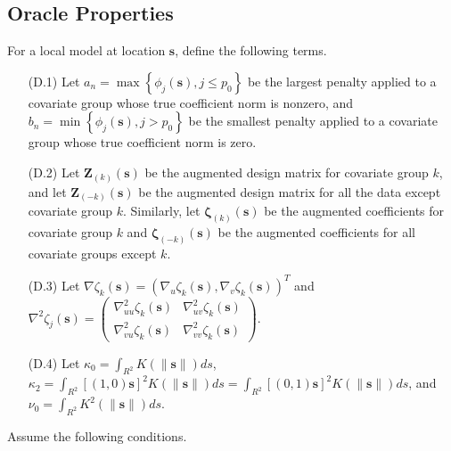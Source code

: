 \documentclass[authoryear,review, 12pt]{elsarticle}
\begin{document}
\subsection{Oracle Properties\label{sub:oracle-properties}}

For a local model at location $\bm{s}$, define the following terms.
\begin{itemize}
\item[(D.1)] Let $a_{n}=\max\left\{ \phi_{j}\left(\bm{s}\right),j\le p_{0}\right\} $
be the largest penalty applied to a covariate group whose true coefficient
norm is nonzero, and $b_{n}=\min\left\{ \phi_{j}\left(\bm{s}\right),j>p_{0}\right\} $
be the smallest penalty applied to a covariate group whose true coefficient
norm is zero.
\item[(D.2)] Let $\bm{Z}_{\left(k\right)}\left(\bm{s}\right)$ be the augmented
design matrix for covariate group $k$, and let $\bm{Z}_{\left(-k\right)}\left(\bm{s}\right)$
be the augmented design matrix for all the data except covariate group
$k$. Similarly, let $\bm{\zeta}_{\left(k\right)}\left(\bm{s}\right)$
be the augmented coefficients for covariate group $k$ and $\bm{\zeta}_{\left(-k\right)}\left(\bm{s}\right)$
be the augmented coefficients for all covariate groups except $k$.
\item[(D.3)] Let $\nabla\zeta_{k}\left(\bm{s}\right)=\left(\nabla_{u}\zeta_{k}\left(\bm{s}\right),\nabla_{v}\zeta_{k}\left(\bm{s}\right)\right)^{T}$
and $\nabla^{2}\zeta_{j}\left(\bm{s}\right)=\left(\begin{array}{cc}
\nabla_{uu}^{2}\zeta_{k}\left(\bm{s}\right) & \nabla_{uv}^{2}\zeta_{k}\left(\bm{s}\right)\\
\nabla_{vu}^{2}\zeta_{k}\left(\bm{s}\right) & \nabla_{vv}^{2}\zeta_{k}\left(\bm{s}\right)
\end{array}\right)$.
\item[(D.4)] Let $\kappa_{0}=\int_{R^{2}}K\left(\|\bm{s}\|\right)ds$, $\kappa_{2}=\int_{R^{2}}[(1,0)\bm{s}]^{2}K\left(\|\bm{s}\|\right)ds=\int_{R^{2}}[(0,1)\bm{s}]^{2}K\left(\|\bm{s}\|\right)ds$,
and $\nu_{0}=\int_{R^{2}}K^{2}\left(\|\bm{s}\|\right)ds$.
\end{itemize}
Assume the following conditions.
\end{document}
